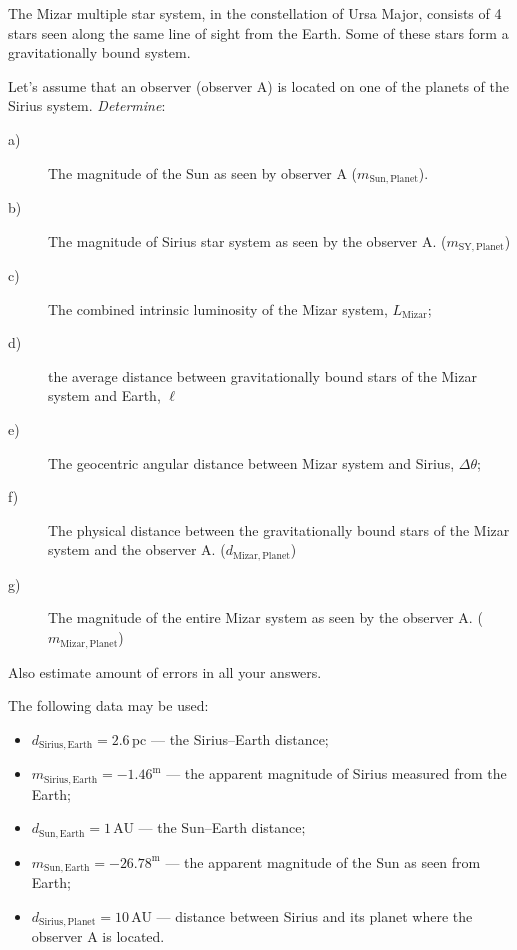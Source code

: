 The Mizar multiple star system, in the constellation of Ursa Major, consists
of 4 stars seen along the same line of sight from the Earth. Some of these
stars form a gravitationally bound system.

Let's assume that an observer (observer A) is located on one of the planets of
the Sirius system. \emph{Determine}:

\begin{description}
\item[a)] The magnitude of the Sun as seen by observer A
  ($m_{\mathrm{Sun,Planet}}$).
\item[b)] The magnitude of Sirius star system as seen by the observer A.
  ($m_{\mathrm{SY,Planet}}$)
\item[c)] The combined intrinsic luminosity of the Mizar system,
  $L_{\mathrm{Mizar}}$;
\item[d)] the average distance between gravitationally bound stars of the
  Mizar system and Earth, $\ell$
\item[e)] The geocentric angular distance between Mizar system and Sirius,
  $\Delta\theta$;
\item[f)] The physical distance between the gravitationally bound stars of
  the Mizar system and the observer A. ($d_{\mathrm{Mizar,Planet}}$)
\item[g)] The magnitude of the entire Mizar system as seen by the observer A.
  ($m_{\mathrm{Mizar,Planet}}$)
\end{description}

Also estimate amount of errors in all your answers.

The following data may be used:
\begin{itemize}
\item $d_{\mathrm{Sirius,Earth}} = 2.6$\,pc --- the Sirius--Earth distance;
\item $m_{\mathrm{Sirius,Earth}} = -1.46^{\mathrm{m}}$ --- the apparent
  magnitude of Sirius measured from the Earth;
\item $d_{\mathrm{Sun,Earth}} = 1$\,AU --- the Sun--Earth distance;
\item $m_{\mathrm{Sun,Earth}} = -26.78^{\mathrm{m}}$ --- the apparent
  magnitude of the Sun as seen from Earth;
\item $d_{\mathrm{Sirius,Planet}} = 10$\,AU --- distance between Sirius and
  its planet where the observer A is located.
\end{itemize}

